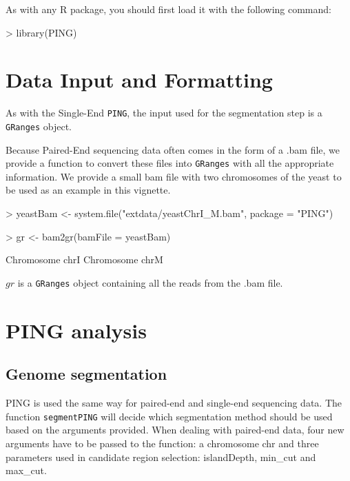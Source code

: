 \documentclass[11pt]{article}
\begin{document}
As with any R package, you should first load it with the following command:

\begin{Schunk}
\begin{Sinput}
> library(PING)
\end{Sinput}
\end{Schunk}

\section{Data Input and Formatting}
As with the Single-End \texttt{PING}, the input used for the segmentation step is a \texttt{GRanges} object.

Because Paired-End sequencing data often comes in the form of a .bam file, we provide a function to convert these files into \texttt{GRanges} with all the appropriate information.
We provide a small bam file with two chromosomes of the yeast to be used as an example in this vignette.

\begin{Schunk}
\begin{Sinput}
> yeastBam <- system.file("extdata/yeastChrI_M.bam", package = "PING")
\end{Sinput}
\end{Schunk}

\begin{Schunk}
\begin{Sinput}
> gr <- bam2gr(bamFile = yeastBam)
\end{Sinput}
\begin{Soutput}
Chromosome  chrI 
Chromosome  chrM 
\end{Soutput}
\end{Schunk}
$gr$ is a \texttt{GRanges} object containing all the reads from the .bam file. 


\section{PING analysis}

\subsection{Genome segmentation}
PING is used the same way for paired-end and single-end sequencing data. The
function \texttt{segmentPING} will decide which segmentation method should be
used based on the arguments provided. 
When dealing with paired-end data, four new arguments have to be passed to the
function: a chromosome chr and three parameters used in candidate region
selection: islandDepth, min_cut and max_cut.
\end{document}
